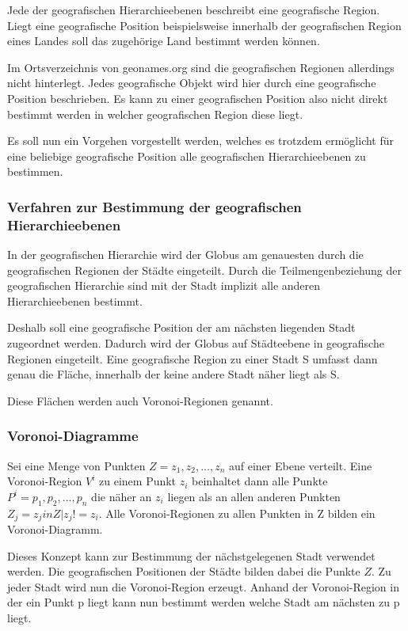 			Jede der geografischen Hierarchieebenen beschreibt eine geografische Region.
			Liegt eine geografische Position beispielsweise innerhalb der geografischen Region eines Landes soll das zugehörige Land bestimmt werden können.

			Im Ortsverzeichnis von geonames.org sind die geografischen Regionen allerdings nicht hinterlegt.
			Jedes geografische Objekt wird hier durch eine geografische Position beschrieben.
			Es kann zu einer geografischen Position also nicht direkt bestimmt werden in welcher geografischen Region diese liegt.

			Es soll nun ein Vorgehen vorgestellt werden, welches es trotzdem ermöglicht für eine beliebige geografische Position alle geografischen Hierarchieebenen zu bestimmen.
			
			\subsubsection{Verfahren zur Bestimmung der geografischen Hierarchieebenen}

				In der geografischen Hierarchie wird der Globus am genauesten durch die geografischen Regionen der Städte eingeteilt.
				Durch die Teilmengenbeziehung der geografischen Hierarchie sind mit der Stadt implizit alle anderen Hierarchieebenen bestimmt.

				Deshalb soll eine geografische Position der am nächsten liegenden Stadt zugeordnet werden.
				Dadurch wird der Globus auf Städteebene in geografische Regionen eingeteilt. 
				Eine geografische Region zu einer Stadt S umfasst dann genau die Fläche, innerhalb der keine andere Stadt näher liegt als S.

				Diese Flächen werden auch Voronoi-Regionen genannt.

			\subsubsection{Voronoi-Diagramme} 

				Sei eine Menge von Punkten $Z = {z_1,z_2,...,z_n}$ auf einer Ebene verteilt.
				Eine Voronoi-Region $V^i$ zu einem Punkt $z_i$ beinhaltet dann alle Punkte $P^i={p_1,p_2,...,p_n}$ die näher an $z_i$ liegen als an allen anderen Punkten $Z_j={z_j in Z|z_j!=z_i}$.
				Alle Voronoi-Regionen zu allen Punkten in Z bilden ein Voronoi-Diagramm.

				Dieses Konzept kann zur Bestimmung der nächstgelegenen Stadt verwendet werden. 
				Die geografischen Positionen der Städte bilden dabei die Punkte $Z$.
				Zu jeder Stadt wird nun die Voronoi-Region erzeugt. 
				Anhand der Voronoi-Region in der ein Punkt p liegt kann nun bestimmt werden welche Stadt am nächsten zu p liegt.

